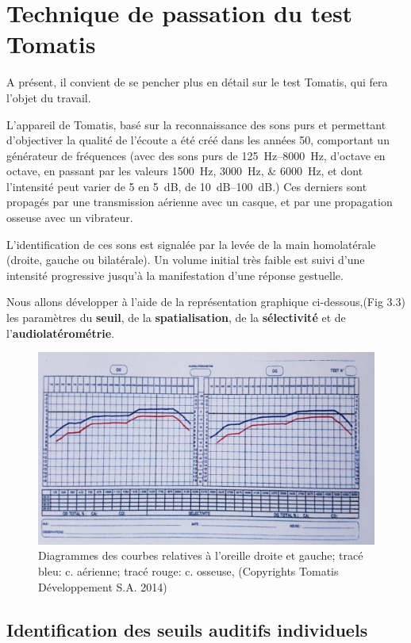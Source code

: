 \section{Technique de passation du test Tomatis}
A présent, il convient de se pencher plus en détail sur le test
Tomatis, qui fera l'objet du travail.

L'appareil de Tomatis, basé sur la reconnaissance des sons purs et
permettant d'objectiver la qualité de l'écoute
 a été créé dans les années 50, comportant un générateur de fréquences
 (avec
 des sons
  purs de \SIrange{125}{8000}{\Hz}, d'octave en octave, en passant par les valeurs
\SIlist{1500;3000;6000}{\Hz}, et dont l'intensité peut varier de 5 en \SI{5}{\dB}, de \SIrange{10}{100}{\dB}.)
Ces derniers sont propagés par une
  transmission aérienne avec un casque, et par une propagation osseuse
  avec un vibrateur.

  L'identification de ces sons est
  signalée par la levée de la main homolatérale (droite, gauche ou
  bilatérale).
Un volume initial très faible est suivi d'une intensité
progressive jusqu'à la manifestation d'une réponse gestuelle.

Nous allons développer à l'aide de la représentation
graphique ci-dessous,(Fig 3.3) les paramètres du\textbf{ seuil}, de la
\textbf{spatialisation}, de la \textbf{sélectivité} et de l'\textbf{au\-dio\-latérométrie}.


\begin{figure}
	\centering
	\includegraphics[width=0.7\linewidth]{images/courbeideale.jpg}
	\caption{Diagrammes des courbes relatives à l'oreille droite et
          gauche; tracé bleu: c. aérienne; tracé rouge: c.
          osseuse, (Copyrights Tomatis Développement S.A.  2014) }
	\label{fig:courbeideale}
\end{figure}




\subsection{Identification des seuils auditifs individuels}

